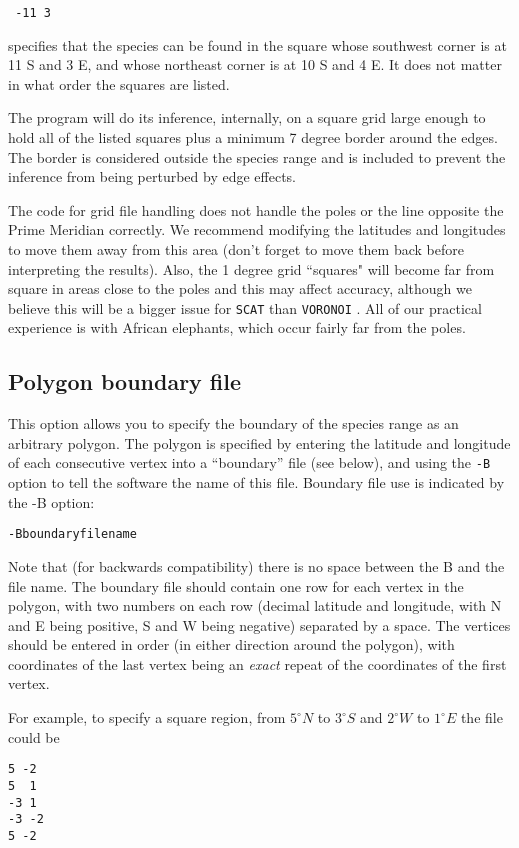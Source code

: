 \documentclass[10pt,titlepage,times,letterpaper]{article}
\def\SCAT{{\tt SCAT} }
\def\VORONOI{{\tt VORONOI} }
\begin{document}
\medskip

{\noindent
{\tt
-11 3 \\
}}

specifies that the species can be found in the square whose southwest corner is at 11 S and 3 E,
and whose northeast corner is at 10 S and 4 E.  It does not matter in what order the squares are listed.

The program will do its inference, internally, on a square grid large enough to hold all of the
listed squares plus a minimum 7 degree border around the edges.   The border is considered 
outside the species range and is included to prevent the inference from being perturbed by
edge effects.

The code for grid file handling does not handle the poles or the line opposite the Prime 
Meridian 
correctly.  We recommend modifying the latitudes and longitudes to move them away from this 
area (don't forget to move them back before interpreting the results).  Also, the 1 degree 
grid ``squares" will become far from square in areas close to the poles and this may affect 
accuracy, although 
we believe this will be a bigger issue for \SCAT than \VORONOI.  All of our practical 
experience is with African elephants, which occur fairly far from the poles.

\subsection{Polygon boundary file}

This option allows you to specify the boundary of the species range as an arbitrary 
polygon.  The polygon is specified by entering the latitude and longitude of
each consecutive vertex into a ``boundary'' file (see below), and using
the {\tt -B} option to tell the software the name of this file.
Boundary file use is indicated by the -B option:

{\tt -Bboundaryfilename}

Note that (for backwards compatibility) there is no space between the B and the file name.
The boundary file should contain one row for each vertex in the
polygon, with two numbers on each row (decimal latitude and longitude,
with N and E being positive, S and W being negative) separated by a
space. The vertices should be entered in order (in either direction
around the polygon), with coordinates of the last vertex being an {\it
exact} repeat of the coordinates of the first vertex.

For example, to specify a square region, from $5^\circ N$ to $3^\circ S$ and
$2^\circ W$ to $1^\circ E$ the file could be
\begin{verbatim}
5 -2
5  1
-3 1
-3 -2
5 -2
\end{verbatim}
\end{document}
